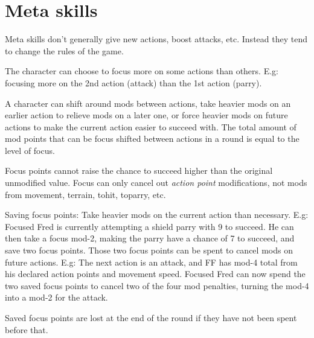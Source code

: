 \closeskillslist


















\section*{Meta skills}

Meta skills don't generally give new actions, boost attacks, etc. Instead they tend to change the rules of the game.



\openskillslist


 The character can choose to focus more on some actions than others. E.g: focusing more on the 2nd action (attack) than the 1st action (parry).

A character can shift around mods between actions, take heavier mods on an earlier action to relieve mods on a later one, or force heavier mods on future actions to make the current action easier to succeed with. The total amount of mod points that can be focus shifted between actions in a round is equal to the level of focus.

Focus points cannot raise the chance to succeed higher than the original unmodified value. Focus can only cancel out \emph{action point} modifications, not mods from movement, terrain, tohit, toparry, etc.

Saving focus points: Take heavier mods on the current action than necessary.
E.g: Focused Fred is currently attempting a shield parry with 9 to succeed. He can then take a focus mod-2, making the parry have a chance of 7 to succeed, and save two focus points. Those two focus points can be spent to cancel mods on future actions. E.g: The next action is an attack, and FF has mod-4 total from his declared action points and movement speed. Focused Fred can now spend the two saved focus points to cancel two of the four mod penalties, turning the mod-4 into a mod-2 for the attack.

Saved focus points are lost at the end of the round if they have not been spent before that.

